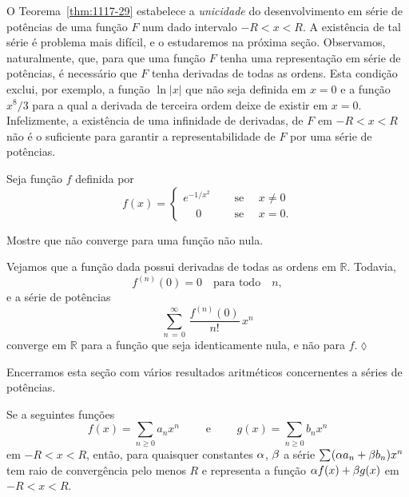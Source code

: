 O Teorema~\ref{thm:1117-29} estabelece a \textit{unicidade} do
desenvolvimento em série de potências de uma função $F$ num dado
intervalo $- R < x < R$. A existência de tal série é problema mais
difícil, e o estudaremos na próxima seção. Observamos,
naturalmente, que, para que uma função $F$ tenha uma representação
em série de potências, é necessário que $F$ tenha derivadas de
todas as ordens. Esta condição exclui, por exemplo, a função $\ln
|x|$ que não seja definida em $x = 0$ e a função $x^{8}/3$ para a
qual a derivada de terceira ordem deixe de existir em $x = 0$.
Infelizmente, a existência de uma infinidade de derivadas, de $F$
em $- R < x < R$ não é o suficiente para garantir a
representabilidade de $F$ por uma série de potências.

\begin{exer}
Seja  função $f$ definida por
\begin{equation*}
  f(x)=
    \begin{cases}
      e^{-1/x^2} & \quad  \text{ se }\quad x\neq 0 \\[2ex]
      \phantom{xx}0 & \quad \text{ se } \quad x=0.
    \end{cases}
\end{equation*}

Mostre que não converge para uma função não nula.
\end{exer}

\solo Vejamos que a função dada possui  derivadas de todas as
ordens em  $\mathbb{R}$. Todavia, 
\begin{equation*}
  f^{(n)}(0) = 0  \quad \text{para todo}\quad  n,
\end{equation*}
e a série de potências  
\begin{equation*}
\sum_{n\, =\, 0}^{\infty}\,\dfrac{f^{(n)}(0)}{n!}\,x^{n}
\end{equation*}
converge em $\mathbb{R}$ para a função que seja identicamente nula, e não
para $f$.\hfill \(\lozenge\)


Encerramos esta seção com vários resultados aritméticos
concernentes a séries de potências.

\begin{teo}\label{1117-30} Se a seguintes funções
\begin{equation*}
f(x) =\sum_{n\geq 0}a_nx^n \qquad \text{ e } \qquad g(x)=\sum_{n\geq 0}b_nx^n
\end{equation*}
em $- R < x < R$, então, para quaisquer constantes $\alpha$, $\beta$ a
série $\sum_{}(\alpha a_n+\beta b_n)x^n$ tem raio de
convergência pelo menos $R$ e representa a função $\alpha f(x) + \beta
g(x)$ em $- R < x < R$.
\end{teo}

